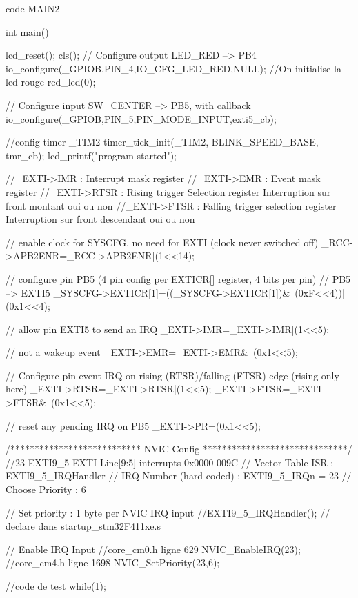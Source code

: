 \begin{Cpp}{code MAIN2} 

int main()
{
    lcd_reset(); cls();
    // Configure output LED_RED   --> PB4
    io_configure(_GPIOB,PIN_4,IO_CFG_LED_RED,NULL); //On initialise la led rouge
    red_led(0);

    // Configure input SW_CENTER --> PB5, with callback
    io_configure(_GPIOB,PIN_5,PIN_MODE_INPUT,exti5_cb);

    
    //config timer _TIM2 
    timer_tick_init(_TIM2, BLINK_SPEED_BASE, tmr_cb);
    lcd_printf("program started"); 
    
    //_EXTI->IMR : Interrupt mask register
    //_EXTI->EMR : Event mask register
    //_EXTI->RTSR : Rising trigger Selection register Interruption sur front montant oui ou non
    //_EXTI->FTSR : Falling trigger selection register Interruption sur front descendant oui ou non

    // enable clock for SYSCFG, no need for EXTI (clock never switched off)
    _RCC->APB2ENR=_RCC->APB2ENR|(1<<14);
    
    // configure pin PB5 (4 pin config per EXTICR[] register, 4 bits per pin)
    //   PB5 --> EXTI5
    _SYSCFG->EXTICR[1]=((_SYSCFG->EXTICR[1])&~(0xF<<4))|(0x1<<4);
        
    // allow pin EXTI5 to send an IRQ
    _EXTI->IMR=_EXTI->IMR|(1<<5);
    
    // not a wakeup event
    _EXTI->EMR=_EXTI->EMR&~(0x1<<5);
    
    // Configure pin event IRQ on rising (RTSR)/falling (FTSR) edge (rising only here)
    _EXTI->RTSR=_EXTI->RTSR|(1<<5);
    _EXTI->FTSR=_EXTI->FTSR&~(0x1<<5);
    
    // reset any pending IRQ on PB5
    _EXTI->PR=(0x1<<5);
    
    /*************************** NVIC Config ******************************/
    //23  EXTI9_5 EXTI Line[9:5] interrupts 0x0000 009C
    // Vector Table ISR         : EXTI9_5_IRQHandler
    // IRQ Number (hard coded)  : EXTI9_5_IRQn = 23
    // Choose Priority          : 6
    
    // Set priority : 1 byte per NVIC IRQ input
    //EXTI9_5_IRQHandler(); // declare dans startup_stm32F411xe.s
    
    // Enable IRQ Input
    //core_cm0.h ligne 629
    NVIC_EnableIRQ(23);
    //core_cm4.h ligne 1698
    NVIC_SetPriority(23,6); 

    //code de test   
    while(1){;}    
}

\end{Cpp}


